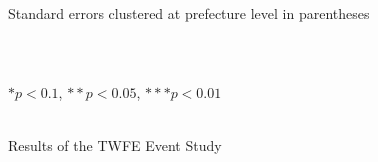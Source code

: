 \documentclass[serif, aspectratio=169]{beamer}
\begin{document}
\begin{frame}
\begin{table}[htbp]
\\\\{\linewidth}{\tiny Standard errors clustered at prefecture level in parentheses}\\\\
\\\\{\linewidth}{\tiny $*p<0.1$, $**p<0.05$, $***p<0.01$}\\\\


\label{table:basic_DID_Monthly_income}

\end{table}

\end{frame}


\begin{frame}


Results of the TWFE Event Study

\vspace{-0.3cm}


\begin{table}[htbp]
\centering
\caption{Effects of Disaster on Monthly Income of Females in Disaster-Affected Prefectures}

\vspace{-0.1cm}



\end{table}
\end{frame}
\end{document}
